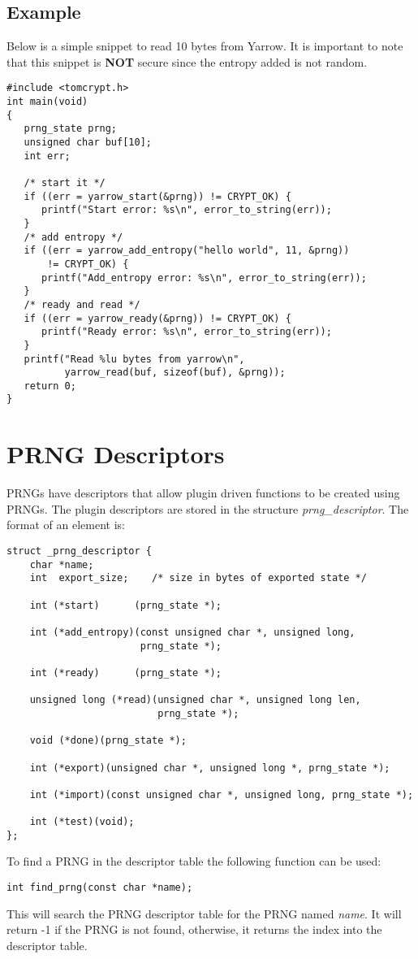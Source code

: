 \documentclass[synpaper]{book}
\newcommand{\mysection}[1]    %
	{                   %
	\section{#1}
   \markboth{\textsf{www.libtom.org}}{\thesection ~ {#1}}
	}
\begin{document}
\subsection{Example}
Below is a simple snippet to read 10 bytes from Yarrow.  It is important to note that this snippet is {\bf NOT} secure since
the entropy added is not random.

\begin{verbatim}
#include <tomcrypt.h>
int main(void)
{
   prng_state prng;
   unsigned char buf[10];
   int err;

   /* start it */
   if ((err = yarrow_start(&prng)) != CRYPT_OK) {
      printf("Start error: %s\n", error_to_string(err));
   }
   /* add entropy */
   if ((err = yarrow_add_entropy("hello world", 11, &prng))
       != CRYPT_OK) {
      printf("Add_entropy error: %s\n", error_to_string(err));
   }
   /* ready and read */
   if ((err = yarrow_ready(&prng)) != CRYPT_OK) {
      printf("Ready error: %s\n", error_to_string(err));
   }
   printf("Read %lu bytes from yarrow\n",
          yarrow_read(buf, sizeof(buf), &prng));
   return 0;
}
\end{verbatim}

\mysection{PRNG Descriptors}
PRNGs have descriptors that allow plugin driven functions to be created using PRNGs. The plugin descriptors are stored in the structure \textit{prng\_descriptor}.  The
format of an element is:
\begin{verbatim}
struct _prng_descriptor {
    char *name;
    int  export_size;    /* size in bytes of exported state */

    int (*start)      (prng_state *);

    int (*add_entropy)(const unsigned char *, unsigned long,
                       prng_state *);

    int (*ready)      (prng_state *);

    unsigned long (*read)(unsigned char *, unsigned long len,
                          prng_state *);

    void (*done)(prng_state *);

    int (*export)(unsigned char *, unsigned long *, prng_state *);

    int (*import)(const unsigned char *, unsigned long, prng_state *);

    int (*test)(void);
};
\end{verbatim}

To find a PRNG in the descriptor table the following function can be used:
\begin{verbatim}
int find_prng(const char *name);
\end{verbatim}
This will search the PRNG descriptor table for the PRNG named \textit{name}.  It will return -1 if the PRNG is not found, otherwise, it returns
the index into the descriptor table.
\end{document}

